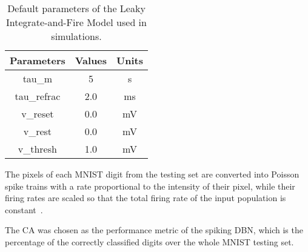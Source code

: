 %
\begin{table}[hbbp]
\centering
\caption{\label{Tab:NeuralParams}Default parameters of the Leaky Integrate-and-Fire Model used in simulations.}
\bgroup
\def\arraystretch{1.1}
  \begin{tabular}{c|c|c}
  Parameters & Values & Units \\
  \hline
  tau\_m & 5 & s\\
  tau\_refrac & 2.0 & ms\\
  v\_reset & 0.0 & mV\\
  v\_rest & 0.0 & mV\\
  v\_thresh & 1.0 & mV\\
  \end{tabular}
\egroup
\end{table}

The pixels of each MNIST digit from the testing set are converted into Poisson spike trains with a rate proportional to the intensity of their pixel, while their firing rates are scaled so that the total firing rate of the input population is constant~\citep{o2013real}.
  
The CA was chosen as the performance metric of the spiking DBN, which is the percentage of the correctly classified digits over the whole MNIST testing set.
 





